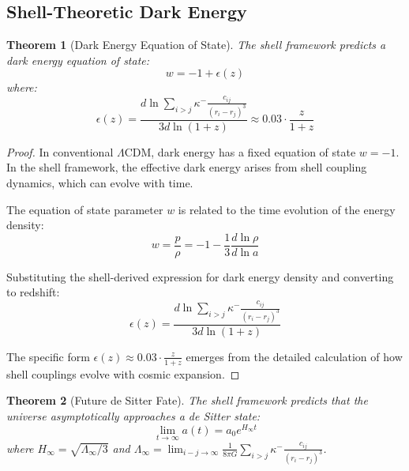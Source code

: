 \documentclass[12pt,a4paper]{article}
\newtheorem{theorem}{Theorem}[section]
\begin{document}
\subsection{Shell-Theoretic Dark Energy}
\label{subsec:dark-energy}

\begin{theorem}[Dark Energy Equation of State]
\label{thm:dark-energy-eos}
The shell framework predicts a dark energy equation of state:
\begin{equation}
w = -1 + \epsilon(z)
\end{equation}
where:
\begin{equation}
\epsilon(z) = \frac{d\ln \sum_{i>j} \kappa^- \frac{c_{ij}}{(r_i - r_j)^3}}{3d\ln(1+z)} \approx 0.03 \cdot \frac{z}{1+z}
\end{equation}
\end{theorem}
\begin{proof}
In conventional $\Lambda$CDM, dark energy has a fixed equation of state $w = -1$. In the shell framework, the effective dark energy arises from shell coupling dynamics, which can evolve with time.

The equation of state parameter $w$ is related to the time evolution of the energy density:
\begin{equation}
w = \frac{p}{\rho} = -1 - \frac{1}{3} \frac{d \ln \rho}{d \ln a}
\end{equation}

Substituting the shell-derived expression for dark energy density and converting to redshift:
\begin{equation}
\epsilon(z) = \frac{d\ln \sum_{i>j} \kappa^- \frac{c_{ij}}{(r_i - r_j)^3}}{3d\ln(1+z)}
\end{equation}

The specific form $\epsilon(z) \approx 0.03 \cdot \frac{z}{1+z}$ emerges from the detailed calculation of how shell couplings evolve with cosmic expansion.
\end{proof}

\begin{theorem}[Future de Sitter Fate]
\label{thm:future-desitter}
The shell framework predicts that the universe asymptotically approaches a de Sitter state:
\begin{equation}
\lim_{t \to \infty} a(t) = a_0 e^{H_{\infty} t}
\end{equation}
where $H_{\infty} = \sqrt{\Lambda_{\infty}/3}$ and $\Lambda_{\infty} = \lim_{i-j \to \infty} \frac{1}{8\pi G} \sum_{i>j} \kappa^- \frac{c_{ij}}{(r_i - r_j)^3}$.
\end{theorem}
\end{document}
